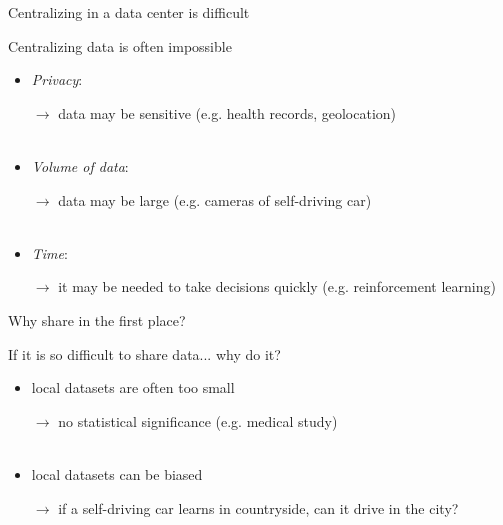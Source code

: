 \documentclass[aspectratio=169,14pt]{beamer}
\begin{document}
\begin{frame}{Centralizing in a data center is difficult}

  Centralizing data is often impossible
  \begin{itemize}
  \item \emph{Privacy}:

    {\small
    $\rightarrow$ data may be sensitive (e.g. health records, geolocation)
    }
    \\
    ~

  \item \emph{Volume of data}:

    {\small
      $\rightarrow$ data may be large (e.g. cameras of self-driving car)
    }
    \\
    ~
    
  \item \emph{Time}:

    {\small
    $\rightarrow$ it may be needed to take decisions quickly (e.g. reinforcement learning)
    }
    
  \end{itemize}

\end{frame}

\begin{frame}{Why share in the first place?}

  If it is so difficult to share data... why do it?
  \begin{itemize}
  \item local datasets are often too small

    {\small
      $\rightarrow$ no statistical significance (e.g. medical study)
    }
    \\
    ~
    
    
  \item local datasets can be biased

    {\small
      $\rightarrow$ if a self-driving car learns in countryside, can it drive in the city?
    }
    \\
    ~
    
        
  \end{itemize}
  
\end{frame}
\end{document}
